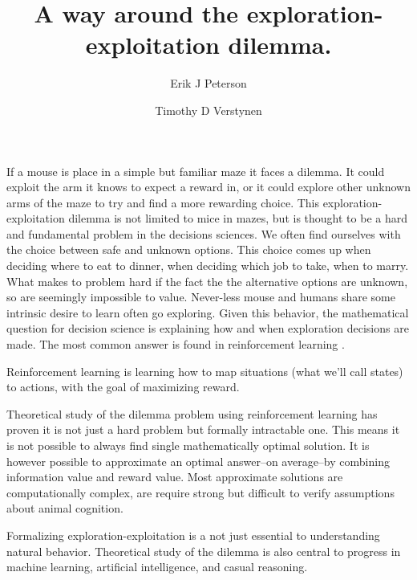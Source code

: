 \documentclass[9pt,twocolumn,twoside]{pnas-new}
\title{A way around the exploration-exploitation dilemma.}
\author[a,1]{Erik J Peterson}
\author[a,b]{Timothy D Verstynen}
\affil[a]{Department of Psychology}
\affil[b]{Center for the Neural Basis of Cognition, Carnegie Mellon University, Pittsburgh PA}
\begin{document}
\verticaladjustment{-2pt}
\maketitle


\thispagestyle{firststyle}

If a mouse is place in a simple but familiar maze it faces a dilemma. It could exploit the arm it knows to expect a reward in, or it could explore other unknown arms of the maze to try and find a more rewarding choice. This exploration-exploitation dilemma is not limited to mice in mazes, but is thought to be a hard and fundamental problem in the decisions sciences. We often find ourselves with the choice between safe and unknown options. This choice comes up when deciding where to eat to dinner, when deciding which job to take, when to marry. What makes to problem hard if the fact the the alternative options are unknown, so are seemingly impossible to value. Never-less mouse and humans share some intrinsic desire to learn often go exploring. Given this behavior, the mathematical question for decision science is explaining how and when exploration decisions are made. The most common answer is found in reinforcement learning \cite{Sutton2018a}. 

Reinforcement learning is learning how to map situations (what we'll call states) to actions, with the goal of maximizing reward. 

Theoretical study of the dilemma problem using reinforcement learning has proven it is not just a hard problem but formally intractable one. This means it is not possible to always find single mathematically optimal solution. It is however possible to approximate an optimal answer--on average--by combining information value and reward value. Most approximate solutions are computationally complex, are require strong but difficult to verify assumptions about animal cognition. 

Formalizing exploration-exploitation is a not just essential to understanding natural behavior. Theoretical study of the dilemma is also central to progress in machine learning, artificial intelligence, and casual reasoning.
\end{document}
